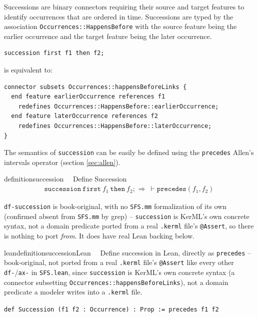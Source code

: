 

\pn Successions are binary connectors requiring their source and target features to identify occurrences that are ordered
in time.  Successions are typed by the association \texttt{Occurrences::HappensBefore} with the source feature being the earlier occurrence and the target feature being the later occurrence.

\begin{lstlisting}
succession first f1 then f2;
\end{lstlisting}
is equivalent to:
\begin{lstlisting}
connector subsets Occurrences::happensBeforeLinks {
  end feature earlierOccurrence references f1
    redefines Occurrences::HappensBefore::earlierOccurrence;
  end feature laterOccurrence references f2
    redefines Occurrences::HappensBefore::laterOccurrence;
}
\end{lstlisting}


\pn The semantics of \texttt{succession} can be easily be defined using the \texttt{precedes} Allen's intervals operator (section \ref{sec:allen}).


\begin{restatable}{definition}{succession}~~   Define Succession
\begin{align}
\texttt{succession}~\texttt{first}~f_1~\texttt{then}~f_2\texttt{;}~\Rightarrow~ %
\vdash \texttt{precedes}(f_1,f_2)~\label{eq:df-succession}\tag{df-succession}
\end{align}
\end{restatable}

\pn \texttt{df-succession} is book-original, with no \texttt{SFS.mm} formalization of its own
(confirmed absent from \texttt{SFS.mm} by grep) -- \texttt{succession} is KerML's own concrete
syntax, not a domain predicate ported from a real \texttt{.kerml} file's \texttt{@Assert}, so there
is nothing to port \emph{from}. It does have real Lean backing below.

\begin{restatable}{leandefinition}{successionLean}~~ Define succession in Lean,
directly as \texttt{precedes} -- book-original, not ported from a real \texttt{.kerml} file's
\texttt{@Assert} like every other \texttt{df-}/\texttt{ax-} in \texttt{SFS.lean}, since
\texttt{succession} is KerML's own concrete syntax (a connector subsetting
\texttt{Occurrences::happensBeforeLinks}), not a domain predicate a modeler writes into a
\texttt{.kerml} file.

\texttt{\textcolor{leancolor}{def} \textcolor{leanyellow}{Succession} (f1 f2 : Occurrence) : Prop := precedes f1 f2}
\label{Succession}
\end{restatable}

